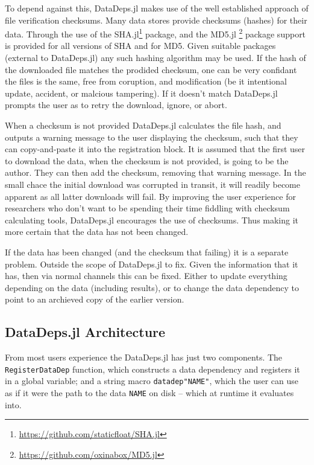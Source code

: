 \documentclass{jors}
\newcommand{\datadep}[1]{\texttt{datadep"{}#1"{}}}
\begin{document}
To depend against this, DataDeps.jl makes use of  the well established approach of file verification checksums.
Many data stores provide checksums (hashes) for their data.
Through the use of the SHA.jl\footnote{\url{https://github.com/staticfloat/SHA.jl}} package, and the MD5.jl \footnote{\url{https://github.com/oxinabox/MD5.jl}} package support is provided for all versions of SHA and for MD5.
Given suitable packages (external to DataDeps.jl) any such hashing algorithm may be used.
If the hash of the downloaded file matches the prodided checksum, one can be very confidant the files is the same, free from coruption, and modification (be it intentional update, accident, or malcious tampering).
If it doesn't match DataDeps.jl prompts the user as to retry the download, ignore, or abort.


When a checksum is not provided DataDeps.jl calculates the file hash, and outputs a warning message to the user displaying the checksum, such that they can copy-and-paste it into the registration block.
It is assumed that the first user to download the data, when the checksum is not provided, is going to be the author.
They can then add the checksum, removing that warning message.
In the small chace the initial download was corrupted in transit, it will readily become apparent as all latter downloads will fail.
By improving the user experience for researchers who don't want to be spending their time fiddling with checksum calculating tools, DataDeps.jl encourages the use of checksums.
Thus making it more certain that the data has not been changed.

If the data has been changed (and the checksum that failing) it is a separate problem.
Outside the scope of DataDeps.jl to fix.
Given the information that it has, then via normal channels this can be fixed.
Either to update everything depending on the data (including results),
or to change the data dependency to point to an archieved copy of the earlier version.




\subsection{DataDeps.jl Architecture}
From most users experience the DataDeps.jl has just two components.
The \texttt{RegisterDataDep} function, which constructs a data dependency and registers it in a global variable;
and  a string macro \datadep{NAME}, which the user can use as if it were the path to the data \texttt{NAME} on disk -- which at runtime it evaluates into.
\end{document}
